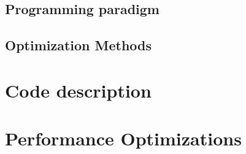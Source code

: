 \documentclass[12pt,oneside,bibtotoc,liststotoc]{scrbook}
\begin{document}
\section{Programming paradigm}

\section{Optimization Methods}



\chapter{Code description}




\chapter{Performance Optimizations}










\newpage

\begin{appendices}

\end{appendices}



\end{document}
